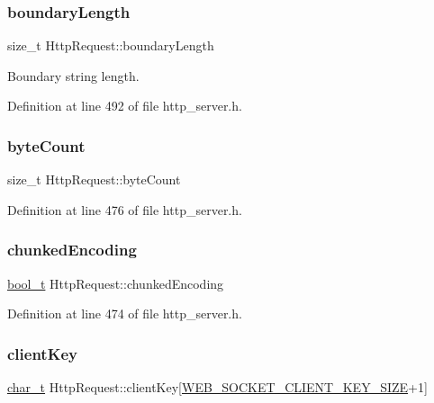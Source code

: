 \subsubsection{\texorpdfstring{boundary\+Length}{boundaryLength}}
{\footnotesize\ttfamily size\+\_\+t Http\+Request\+::boundary\+Length}



Boundary string length. 



Definition at line 492 of file http\+\_\+server.\+h.

\mbox{\label{structHttpRequest_a67315b0475e5b5b12586f549ad715fce}} 
\subsubsection{\texorpdfstring{byte\+Count}{byteCount}}
{\footnotesize\ttfamily size\+\_\+t Http\+Request\+::byte\+Count}



Definition at line 476 of file http\+\_\+server.\+h.

\mbox{\label{structHttpRequest_a727477dfc2e10a7f8b0a8171dae8d429}} 
\subsubsection{\texorpdfstring{chunked\+Encoding}{chunkedEncoding}}
{\footnotesize\ttfamily \hyperlink{compiler__port_8h_a812d16e5494522586b3784e55d479912}{bool\+\_\+t} Http\+Request\+::chunked\+Encoding}



Definition at line 474 of file http\+\_\+server.\+h.

\mbox{\label{structHttpRequest_a99055e13726e27634f85c3ea7a78fe9b}} 
\subsubsection{\texorpdfstring{client\+Key}{clientKey}}
{\footnotesize\ttfamily \hyperlink{compiler__port_8h_a40bb5262bf908c328fbcfbe5d29d0201}{char\+\_\+t} Http\+Request\+::client\+Key\mbox{[}\hyperlink{web__socket_8h_aec52a37b246082418c0b6dbf0235e99d}{W\+E\+B\+\_\+\+S\+O\+C\+K\+E\+T\+\_\+\+C\+L\+I\+E\+N\+T\+\_\+\+K\+E\+Y\+\_\+\+S\+I\+ZE}+1\mbox{]}}



